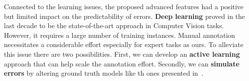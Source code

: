     Connected to the learning issues, the proposed advanced features had a positive but limited impact on the predictability of errors.
    \textbf{Deep learning} proved in the last decade to be the state-of-the-art approach in Computer Vision tasks.
    However, it requires a large number of training instances.
    Manual annotation necessitates a considerable effort especially for expert tasks as ours.
    To alleviate this issue there are two possibilities.
    First, we can develop an \textbf{active learning} approach that can help scale the annotation effort.
    Secondly, we can \textbf{simulate errors} by altering ground truth models like th ones presented in~\parencite{rottensteiner2012isprs}.
